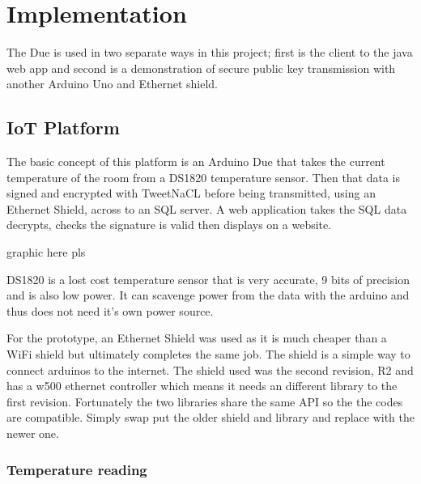 
\chapter{Implementation}
\label{imple}


The Due is used in two separate ways in this project; first is the client to the java web app and second is a demonstration of secure public key transmission with another Arduino Uno and Ethernet shield. 

\section{IoT Platform}

The basic concept of this platform is an Arduino Due that takes the current temperature of the room from a DS1820 temperature sensor. Then that data is signed and encrypted with TweetNaCL before being transmitted, using an Ethernet Shield, across to an SQL server. A web application takes the SQL data decrypts, checks the signature is valid then displays on a website. 

graphic here pls


DS1820 is a lost cost temperature sensor that is very accurate, 9 bits of precision and is also low power. It can scavenge power from the data with the arduino and thus does not need it's own power source. 

For the prototype, an Ethernet Shield was used as it is much cheaper than a WiFi shield but ultimately completes the same job. The shield is a simple way to connect arduinos to the internet. The shield used was the second revision, R2 and has a w500 ethernet controller which means it needs an different library to the first revision. Fortunately the two libraries share the same API so the the codes are compatible. Simply swap put the older shield and library and replace with the newer one.


\subsection{Temperature reading}

